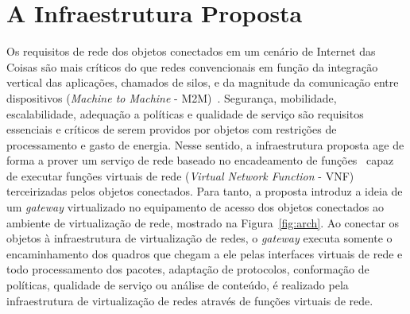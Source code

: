 \documentclass[12pt]{article}
\begin{document}
\section{A Infraestrutura Proposta}
\label{sec:infra}

Os requisitos de rede dos objetos conectados em um cenário de Internet das Coisas são mais críticos do que redes convencionais em função da integração vertical das aplicações, chamados de silos, e da magnitude da comunicação entre dispositivos ({\it Machine to Machine} - M2M)~\cite{how-sdn-nfv-iot}. Segurança, mobilidade, escalabilidade, adequação a políticas e qualidade de serviço são requisitos essenciais e  
críticos de serem providos por objetos com restrições de processamento e gasto de energia.
%
Nesse sentido, a infraestrutura proposta age de forma a prover um serviço de rede baseado no encadeamento de funções~\cite{sbseg-nfv} capaz de executar funções virtuais de rede (\textit{Virtual Network Function} - VNF) terceirizadas pelos objetos conectados. 
Para tanto, a proposta introduz a ideia de um {\it gateway} virtualizado no equipamento de acesso dos objetos conectados ao ambiente de virtualização de rede, mostrado na Figura~\ref{fig:arch}. Ao conectar os objetos à infraestrutura de virtualização de redes, o {\it gateway} executa somente o encaminhamento dos quadros que chegam a ele pelas interfaces virtuais de rede e todo processamento dos pacotes, adaptação de protocolos, conformação de políticas, qualidade de serviço ou análise de conteúdo, é realizado pela infraestrutura de virtualização de redes através de funções virtuais de rede.
\end{document}
